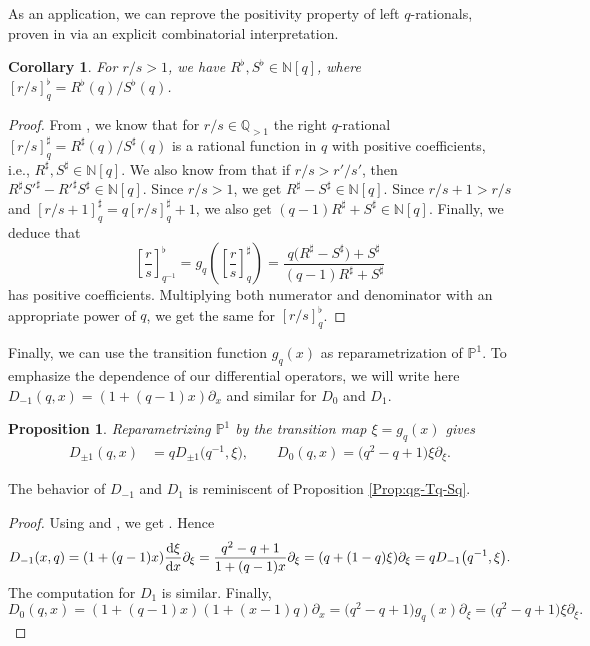 \documentclass[10pt,a4paper]{amsart}
\numberwithin{equation}{section}
\newtheorem{Corollary}[Theorem]{Corollary}
\newtheorem{Proposition}[Theorem]{Proposition}
 { \theoremstyle{definition}
\newtheorem{Definition}[Theorem]{Definition}
\newtheorem{Note}[Theorem]{Note}
\newtheorem{Example}[Theorem]{Example}
\newtheorem{Remark}[Theorem]{Remark} }
\newcommand*{\Q}{\mathbb{Q}}
\newcommand*{\N}{\mathbb{N}}
\begin{document}
As an application, we can reprove the positivity property of left $q$-rationals, proven in \cite[Appendix A.1]{bapat2023q} via an explicit combinatorial interpretation.

\begin{Corollary}
For $r/s>1$, we have $R^\flat, S^\flat\in\N[q]$, where $[r/s]_q^\flat=R^\flat(q)/S^\flat(q)$.
\end{Corollary}
\begin{proof}
From \cite[Proposition 1.3]{morier2020continued}, we know that for $r/s\in\Q_{>1}$ the right $q$-rational $[r/s]_q^\sharp=R^\sharp(q)/S^\sharp(q)$ is a rational function in $q$ with positive coefficients, i.e., $R^\sharp, S^\sharp\in \mathbb{N}[q]$. We also know from \cite[Theorem 2]{morier2020continued} that if $r/s> r'/s'$, then $R^\sharp S'^\sharp-R'^\sharp S^\sharp \in \N[q]$. Since ${r/s>1}$, we get ${R^\sharp-S^\sharp\in\N[q]}$. Since $r/s+1>r/s$ and $[r/s+1]_q^\sharp=q[r/s]_q^\sharp+1$, we also get ${(q-1)R^\sharp+S^\sharp \in\N[q]}$. Finally, we deduce that
\[
\left[\frac{r}{s}\right]_{q^{-1}}^\flat = g_q\left(\left[\frac{r}{s}\right]_q^\sharp\right)=\frac{q\big(R^\sharp-S^\sharp\big)+S^\sharp}{(q-1)R^\sharp+S^\sharp}
\]
has positive coefficients. Multiplying both numerator and denominator with an appropriate power of $q$, we get the same for $[r/s]^\flat_q$.
\end{proof}


Finally, we can use the transition function $g_q(x)$ as reparametrization of $\mathbb{P}^1$. To emphasize the dependence of our differential operators, we will write here $D_{-1}(q,x)=(1+(q-1)x)\partial_x$ and similar for $D_0$ and $D_{1}$.
\begin{Proposition}
Reparametrizing $\mathbb{P}^1$ by the transition map $\xi=g_q(x)$ gives
\begin{align*}
D_{\pm 1}(q,x) &= q D_{\pm 1}\big(q^{-1},\xi\big), \qquad
D_0(q,x) = \big(q^2-q+1\big)\xi \partial_\xi.
\end{align*}
\end{Proposition}
The behavior of $D_{-1}$ and $D_1$ is reminiscent of Proposition \ref{Prop:qg-Tq-Sq}.
\begin{proof}
Using  and , we get . Hence
\[
D_{-1}(x,q)=(1+(q-1)x)\frac{{\rm d}\xi}{{\rm d}x}\partial_\xi = \frac{q^2-q+1}{1+(q-1)x}\partial_\xi = (q+(1-q)\xi)\partial_\xi = qD_{-1}\big(q^{-1},\xi\big).
\]
The computation for $D_{1}$ is similar. Finally,
\[
D_0(q,x)=(1+(q-1)x)(1+(x-1)q)\partial_x = \big(q^2-q+1\big)g_q(x)\partial_\xi = \big(q^2-q+1\big)\xi\partial_\xi.\tag*{\qed}
\]\renewcommand{\qed}{}
\end{proof}
\end{document}
